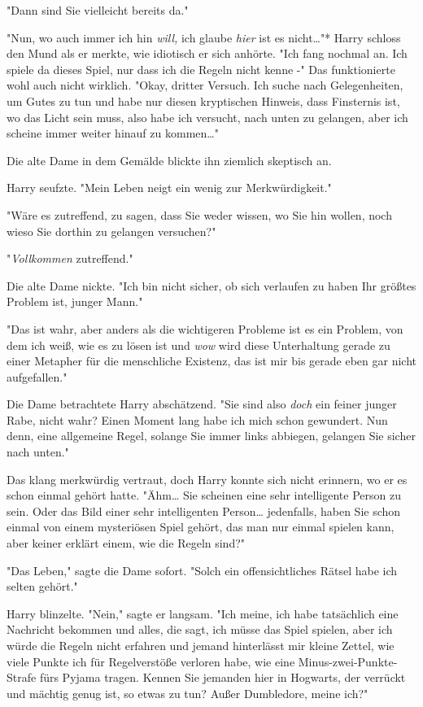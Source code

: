 {"Dann sind Sie vielleicht bereits da."

"Nun, wo auch immer ich hin \emph{will,} ich glaube \emph{hier} ist es nicht…"* Harry schloss den Mund als er merkte, wie idiotisch er sich anhörte. "Ich fang nochmal an. Ich spiele da dieses Spiel, nur dass ich die Regeln nicht kenne -" Das funktionierte wohl auch nicht wirklich. "Okay, dritter Versuch. Ich suche nach Gelegenheiten, um Gutes zu tun und habe nur diesen kryptischen Hinweis, dass Finsternis ist, wo das Licht sein muss, also habe ich versucht, nach unten zu gelangen, aber ich scheine immer weiter hinauf zu kommen…"

Die alte Dame in dem Gemälde blickte ihn ziemlich skeptisch an.

Harry seufzte. "Mein Leben neigt ein wenig zur Merkwürdigkeit."

"Wäre es zutreffend, zu sagen, dass Sie weder wissen, wo Sie hin wollen, noch wieso Sie dorthin zu gelangen versuchen?"

"\emph{Vollkommen} zutreffend."

Die alte Dame nickte. "Ich bin nicht sicher, ob sich verlaufen zu haben Ihr größtes Problem ist, junger Mann."

"Das ist wahr, aber anders als die wichtigeren Probleme ist es ein Problem, von dem ich weiß, wie es zu lösen ist und \emph{wow} wird diese Unterhaltung gerade zu einer Metapher für die menschliche Existenz, das ist mir bis gerade eben gar nicht aufgefallen."

Die Dame betrachtete Harry abschätzend. "Sie sind also \emph{doch} ein feiner junger Rabe, nicht wahr? Einen Moment lang habe ich mich schon gewundert. Nun denn, eine allgemeine Regel, solange Sie immer links abbiegen, gelangen Sie sicher nach unten."

Das klang merkwürdig vertraut, doch Harry konnte sich nicht erinnern, wo er es schon einmal gehört hatte. "Ähm… Sie scheinen eine sehr intelligente Person zu sein. Oder das Bild einer sehr intelligenten Person… jedenfalls, haben Sie schon einmal von einem mysteriösen Spiel gehört, das man nur einmal spielen kann, aber keiner erklärt einem, wie die Regeln sind?"

"Das Leben," sagte die Dame sofort. "Solch ein offensichtliches Rätsel habe ich selten gehört."

Harry blinzelte. "Nein," sagte er langsam. "Ich meine, ich habe tatsächlich eine Nachricht bekommen und alles, die sagt, ich müsse das Spiel spielen, aber ich würde die Regeln nicht erfahren und jemand hinterlässt mir kleine Zettel, wie viele Punkte ich für Regelverstöße verloren habe, wie eine Minus-zwei-Punkte-Strafe fürs Pyjama tragen. Kennen Sie jemanden hier in Hogwarts, der verrückt und mächtig genug ist, so etwas zu tun? Außer Dumbledore, meine ich?"

}
